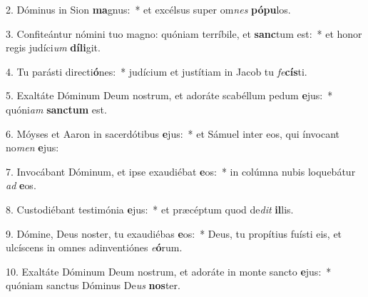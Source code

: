 2. Dóminus in Sion \textbf{ma}gnus:~*  et excélsus super om\textit{nes} \textbf{pó}\textbf{pu}los.\

3. Confiteántur nómini tuo magno: quóniam terríbile, et \textbf{sanc}tum est:~*  et honor regis judíci\textit{um} \textbf{dí}\textbf{li}git.\

4. Tu parásti directi\textbf{ó}nes:~*  judícium et justítiam in Jacob tu \textit{fe}\textbf{cís}ti.\

5. Exaltáte Dóminum Deum nostrum, et adoráte scabéllum pedum \textbf{e}jus:~*  quóni\textit{am} \textbf{sanc}\textbf{tum} est.\

6. Móyses et Aaron in sacerdótibus \textbf{e}jus:~*  et Sámuel inter eos, qui ínvocant no\textit{men} \textbf{e}jus:\

7. Invocábant Dóminum, et ipse exaudiébat \textbf{e}os:~*  in colúmna nubis loquebátur \textit{ad} \textbf{e}os.\

8. Custodiébant testimónia \textbf{e}jus:~*  et præcéptum quod de\textit{dit} \textbf{il}lis.\

9. Dómine, Deus noster, tu exaudiébas \textbf{e}os:~*  Deus, tu propítius fuísti eis, et ulcíscens in omnes adinventiónes \textit{e}\textbf{ó}rum.\

10. Exaltáte Dóminum Deum nostrum, et adoráte in monte sancto \textbf{e}jus:~*  quóniam sanctus Dóminus De\textit{us} \textbf{nos}ter.\

